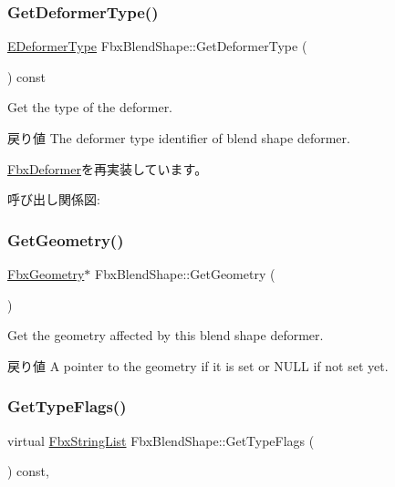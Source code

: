 \subsubsection{\texorpdfstring{Get\+Deformer\+Type()}{GetDeformerType()}}
{\footnotesize\ttfamily \hyperlink{class_fbx_deformer_a07e2cfb767191ba5c8799fdfbfe3eaf6}{E\+Deformer\+Type} Fbx\+Blend\+Shape\+::\+Get\+Deformer\+Type (\begin{DoxyParamCaption}{ }\end{DoxyParamCaption}) const\hspace{0.3cm}{\ttfamily [virtual]}}

Get the type of the deformer. \begin{DoxyReturn}{戻り値}
The deformer type identifier of blend shape deformer. 
\end{DoxyReturn}


\hyperlink{class_fbx_deformer_adbc586e383f788f24d7fce9ed859d481}{Fbx\+Deformer}を再実装しています。

呼び出し関係図\+:
\mbox{\label{class_fbx_blend_shape_a2cea3099fb3f8ba5616d1b794371909e}} 
\subsubsection{\texorpdfstring{Get\+Geometry()}{GetGeometry()}}
{\footnotesize\ttfamily \hyperlink{class_fbx_geometry}{Fbx\+Geometry}$\ast$ Fbx\+Blend\+Shape\+::\+Get\+Geometry (\begin{DoxyParamCaption}{ }\end{DoxyParamCaption})}

Get the geometry affected by this blend shape deformer. \begin{DoxyReturn}{戻り値}
A pointer to the geometry if it is set or {\ttfamily N\+U\+LL} if not set yet. 
\end{DoxyReturn}
\mbox{\label{class_fbx_blend_shape_aa2b22b70c929ac1ad39b12f0ade998d1}} 
\subsubsection{\texorpdfstring{Get\+Type\+Flags()}{GetTypeFlags()}}
{\footnotesize\ttfamily virtual \hyperlink{class_fbx_string_list}{Fbx\+String\+List} Fbx\+Blend\+Shape\+::\+Get\+Type\+Flags (\begin{DoxyParamCaption}{ }\end{DoxyParamCaption}) const\hspace{0.3cm}{\ttfamily [protected]}, {\ttfamily [virtual]}}



